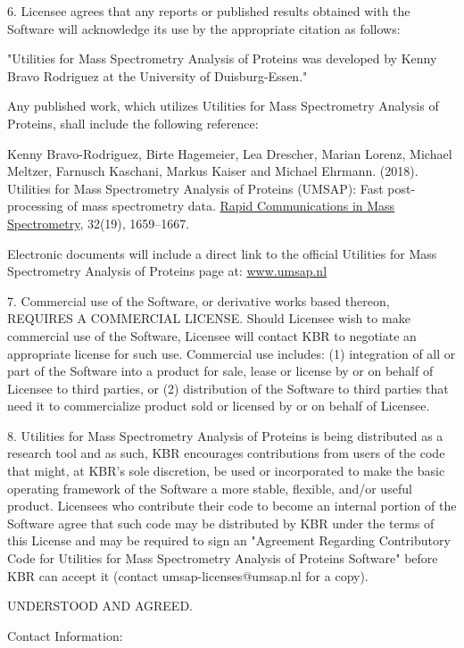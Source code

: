 6. Licensee agrees that any reports or published results obtained with the Software will acknowledge its use by the appropriate citation as follows:

"Utilities for Mass Spectrometry Analysis of Proteins was developed by Kenny Bravo Rodriguez at the University of Duisburg-Essen."

Any published work, which utilizes Utilities for Mass Spectrometry Analysis of Proteins, shall include the following reference:

Kenny Bravo-Rodriguez, Birte Hagemeier, Lea Drescher, Marian Lorenz, Michael Meltzer, Farnusch Kaschani, Markus Kaiser and Michael Ehrmann. (\num{2018}). Utilities for Mass Spectrometry Analysis of Proteins (UMSAP): Fast post-processing of mass spectrometry data. \href{https://onlinelibrary.wiley.com/doi/10.1002/rcm.8243}{Rapid Communications in Mass Spectrometry}, \num{32}(\num{19}), \numrange[range-phrase = --]{1659}{1667}.

Electronic documents will include a direct link to the official Utilities for Mass Spectrometry Analysis of Proteins page at:
\href{https://www.umsap.nl/}{www.umsap.nl}

7. Commercial use of the Software, or derivative works based thereon, REQUIRES A COMMERCIAL LICENSE.  Should Licensee wish to make commercial use of the Software, Licensee will contact KBR to negotiate an appropriate license for such use. Commercial use includes: 
(1) integration of all or part of the Software into a product for sale, lease or license by or on behalf of Licensee to third parties, or 
(2) distribution of the Software to third parties that need it to commercialize product sold or licensed by or on behalf of Licensee.

8. Utilities for Mass Spectrometry Analysis of Proteins is being distributed as a research tool and as such, KBR encourages contributions from users of the code that might, at KBR's sole discretion, be used or incorporated to make the basic operating framework of the Software a more stable, flexible, and/or useful product. Licensees who contribute their code to become an internal portion of the Software agree that such code may be distributed by KBR under the terms of this License and may be required to sign an "Agreement Regarding Contributory Code for Utilities for Mass Spectrometry Analysis of Proteins Software" before KBR can accept it (contact umsap-licenses@umsap.nl for a copy).

UNDERSTOOD AND AGREED.

Contact Information:

